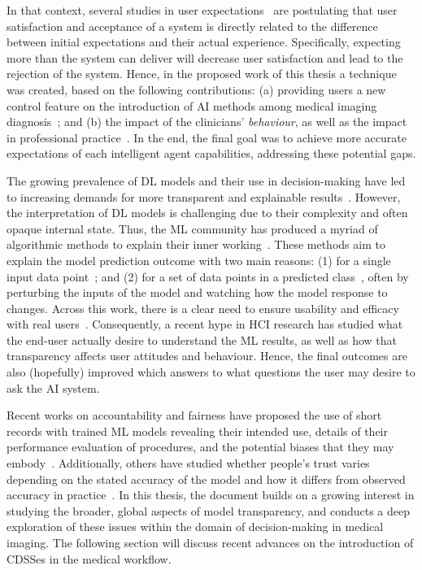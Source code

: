 In that context, several studies in user expectations~\cite{Kocielnik:2019:YAI:3290605.3300641, leung2019health} are postulating that user satisfaction and acceptance of a system is directly related to the difference between initial expectations and their actual experience.
Specifically, expecting more than the system can deliver will decrease user satisfaction and lead to the rejection of the system.
Hence, in the proposed work of this thesis a technique was created, based on the following contributions:
(a) providing users a new control feature on the introduction of \ac{AI} methods among medical imaging diagnosis~\cite{pesapane2018artificial}; and
(b) the impact of the clinicians' {\it behaviour}, as well as the impact in professional practice~\cite{Challen231}.
In the end, the final goal was to achieve more accurate expectations of each intelligent agent capabilities, addressing these potential gaps.

The growing prevalence of \ac{DL} models and their use in decision-making have led to increasing demands for more transparent and explainable results~\cite{10.5555/3305381.3305576}.
However, the interpretation of \ac{DL} models is challenging due to their complexity and often opaque internal state.
Thus, the \ac{ML} community has produced a myriad of algorithmic methods to explain their inner working~\cite{Shakerin_Gupta_2019, 10.1145/3329859.3329878}.
These methods aim to explain the model prediction outcome with two main reasons:
(1) for a single input data point~\cite{10.1145/2939672.2939778}; and
(2) for a set of data points in a predicted class~\cite{pmlr-v80-kim18d}, often by perturbing the inputs of the model and watching how the model response to changes.
Across this work, there is a clear need to ensure usability and efficacy with real users~\cite{10.1145/3173574.3174156}.
Consequently, a recent hype in \ac{HCI} research has studied what the end-user actually desire to understand the \ac{ML} results, as well as how that transparency affects user attitudes and behaviour.
Hence, the final outcomes are also (hopefully) improved which answers to what questions the user may desire to ask the \ac{AI} system.

Recent works on accountability and fairness have proposed the use of short records with trained \ac{ML} models revealing their intended use, details of their performance evaluation of procedures, and the potential biases that they may embody~\cite{10.1145/3351095.3375709, 10.1145/3287560.3287596}.
Additionally, others have studied whether people's trust varies depending on the stated accuracy of the model and how it differs from observed accuracy in practice~\cite{10.1145/3290605.3300509}.
In this thesis, the document builds on a growing interest in studying the broader, global aspects of model transparency, and conducts a deep exploration of these issues within the domain of decision-making in medical imaging.
The following section will discuss recent advances on the introduction of \acp{CDSSe} in the medical workflow.


